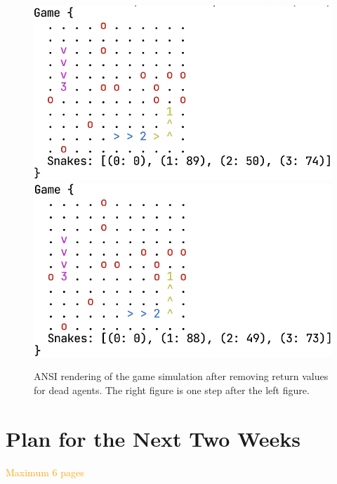 \documentclass[a4paper]{article}
\newcommand{\instruction}[1]{\textcolor{orange}{#1}}
\begin{document}
\begin{figure}
    \centering
    \includegraphics[width=0.4\linewidth]{game_render_eg2.png}\quad
    \includegraphics[width=0.4\linewidth]{game_render_eg3.png}
    \caption{ANSI rendering of the game simulation after removing return values
        for dead agents. The right figure is one step after the left figure.
    }
    \label{fig:render2}
\end{figure}


\section{Plan for the Next Two Weeks}

\instruction{Maximum 6 pages}

\printbibliography
\end{document}
